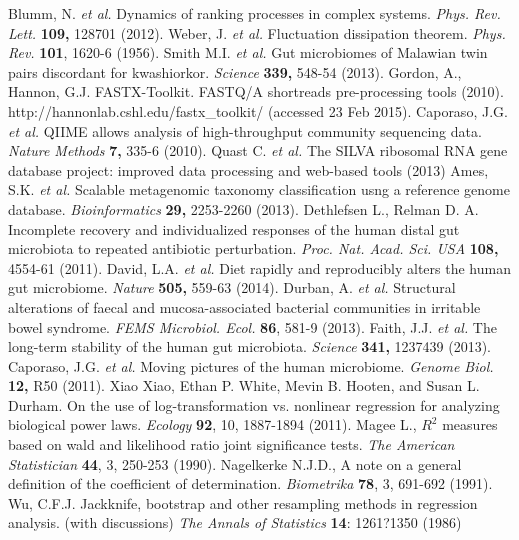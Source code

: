 \documentclass[12pt]{article}
\begin{document}
\newpage
\begin{thebibliography}{1}
	 Blumm, N. \textit{et al.} Dynamics of ranking processes in complex systems. {\it Phys. Rev. Lett.} {\bf 109,} 128701 (2012).
	 Weber, J. \textit{et al.} Fluctuation dissipation theorem. {\it Phys. Rev.} {\bf 101}, 1620-6 (1956).
	 Smith M.I.  \textit{et al.} Gut microbiomes of Malawian twin pairs discordant for kwashiorkor. {\it Science} {\bf 339,} 548-54 (2013).
	 Gordon, A., Hannon, G.J. FASTX-Toolkit. FASTQ/A shortreads pre-processing tools (2010). http://hannonlab.cshl.edu/fastx\_toolkit/ (accessed 23 Feb 2015).
	 Caporaso, J.G. \textit{et al.} QIIME allows analysis of high-throughput community sequencing data. {\it Nature Methods} {\bf 7,} 335-6 (2010).
	 Quast C.  \textit{et al.} The SILVA ribosomal RNA gene database project: improved data processing and web-based tools (2013)
	 Ames, S.K.  \textit{et al.} Scalable metagenomic taxonomy classification usng a reference genome database. {\it Bioinformatics} {\bf 29,} 2253-2260 (2013).
	 Dethlefsen L., Relman D. A. Incomplete recovery and individualized responses of the human distal gut microbiota to repeated antibiotic perturbation. {\it Proc. Nat. Acad. Sci. USA} {\bf 108,} 4554-61 (2011).
	 David, L.A. \textit{et al.} Diet rapidly and reproducibly alters the human gut microbiome. {\it Nature} {\bf 505,} 559-63 (2014).
	 Durban, A. \textit{et al.} Structural alterations of faecal and mucosa-associated bacterial communities in irritable bowel syndrome. {\it FEMS Microbiol. Ecol.} {\bf 86}, 581-9 (2013).
	 Faith, J.J.  \textit{et al.} The long-term stability of the human gut microbiota. {\it Science} {\bf 341,} 1237439 (2013).
	 Caporaso, J.G.  \textit{et al.} Moving pictures of the human microbiome. {\it Genome Biol.} {\bf 12,} R50 (2011).
 	 Xiao Xiao, Ethan P. White, Mevin B. Hooten, and Susan L. Durham. On the use of log-transformation vs. nonlinear regression for analyzing biological power laws. {\it Ecology} {\bf 92}, 10, 1887-1894 (2011).
 	 Magee L., $R^2$ measures based on wald and likelihood ratio joint significance tests. {\it The American Statistician} {\bf 44}, 3, 250-253 (1990).
	 Nagelkerke N.J.D., A note on a general definition of the coefficient of determination. {\it Biometrika} {\bf 78}, 3, 691-692 (1991).
	 Wu, C.F.J. Jackknife, bootstrap and other resampling methods in regression analysis. (with discussions) \textit{The Annals of Statistics} {\bf 14}: 1261?1350 (1986)
\end{thebibliography}
\end{document}
